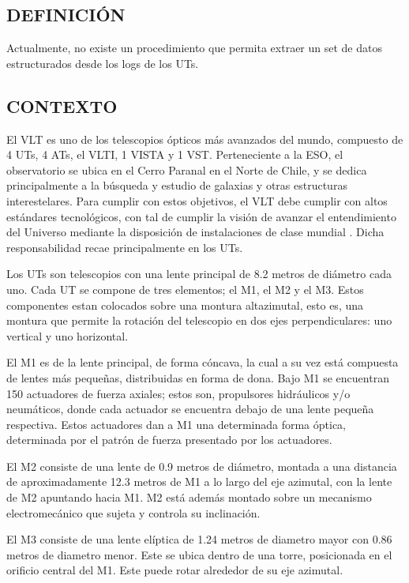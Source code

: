 
\subsection{DEFINICIÓN}

Actualmente, no existe un procedimiento que permita extraer un set de datos estructurados desde los logs de los UTs.

\subsection{CONTEXTO}

El VLT es uno de los telescopios ópticos más avanzados del mundo, compuesto de 4 UTs, 4 ATs, el VLTI, 1 VISTA y 1 VST\cite{eso2023paranal}.
Perteneciente a la ESO, el observatorio se ubica en el Cerro Paranal en el Norte de Chile, y se dedica principalmente a la búsqueda y estudio de galaxias y otras estructuras interestelares\cite{eso1998vlt}.
Para cumplir con estos objetivos, el VLT debe cumplir con altos estándares tecnológicos, con tal de cumplir la visión de avanzar el entendimiento del Universo mediante la disposición de instalaciones de clase mundial \cite{eso1998vlt}. Dicha responsabilidad recae principalmente en los UTs.

Los UTs son telescopios con una lente principal de 8.2 metros de diámetro cada uno. Cada UT se compone de tres elementos; el M1, el M2 y el M3. Estos componentes estan colocados sobre una montura altazimutal, esto es, una montura que permite la rotación del telescopio en dos ejes perpendiculares: uno vertical y uno horizontal.\cite{eso2011m2}

El M1 es de la lente principal, de forma cóncava, la cual a su vez está compuesta de lentes más pequeñas, distribuidas en forma de dona.
Bajo M1 se encuentran 150 actuadores de fuerza axiales; estos son, propulsores hidráulicos y/o neumáticos, donde cada actuador se encuentra debajo de una lente pequeña respectiva.
Estos actuadores dan a M1 una determinada forma óptica, determinada por el patrón de fuerza presentado por los actuadores\cite{eso1998vlt}.

El M2 consiste de una lente de 0.9 metros de diámetro, montada a una distancia de aproximadamente 12.3 metros de M1 a lo largo del eje azimutal, con la lente de M2 apuntando hacia M1.
M2 está además montado sobre un mecanismo electromecánico que sujeta y controla su inclinación\cite{eso2011m2}. 

El M3 consiste de una lente elíptica de 1.24 metros de diametro mayor con 0.86 metros de diametro menor. Este se ubica dentro de una torre, posicionada en el orificio central del M1.
Este puede rotar alrededor de su eje azimutal\cite{eso2011m1}.

